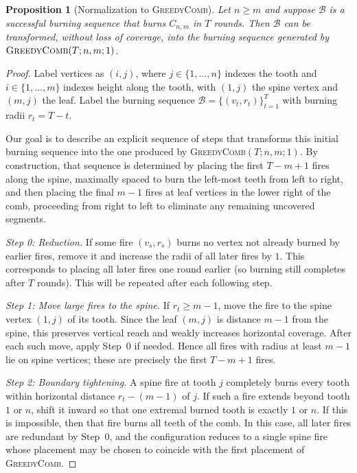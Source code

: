\documentclass{article}
\newtheorem{proposition}{Proposition}
\begin{document}
\begin{proposition}[Normalization to \textsc{GreedyComb}]\label{prop: normalize_greedy_comb}
Let $n \ge m$ and suppose $\mathcal B$ is a successful burning sequence
that burns $C_{n,m}$ in $T$ rounds.
Then $\mathcal B$ can be transformed, without loss of coverage,
into the burning sequence generated by $\textsc{GreedyComb}(T;n,m;1)$.
\end{proposition}

\begin{proof}
Label vertices as $(i,j)$,
where $j\in\{1,\dots,n\}$ indexes the tooth
and $i\in\{1,\dots,m\}$ indexes height along the tooth,
with $(1,j)$ the spine vertex
and $(m,j)$ the leaf. Label the burning sequence $\mathcal B=\{(v_t,r_t)\}_{t=1}^T$
with burning radii $r_t=T-t$.

Our goal is to describe an explicit sequence of steps that transforms this initial burning sequence into the one produced by \textsc{GreedyComb}$(T;n,m;1)$. By construction, that sequence is determined by placing the first $T-m+1$ fires along the spine, maximally spaced to burn the left-most teeth from left to right, and then placing the final $m-1$ fires at leaf vertices in the lower right of the comb, proceeding from right to left to eliminate any remaining uncovered segments.

\medskip
\noindent
\emph{Step 0: Reduction.}
If some fire $(v_s,r_s)$ burns no vertex
not already burned by earlier fires,
remove it and increase the radii of all later fires by $1$.
This corresponds to placing all later fires one round earlier (so burning still completes after $T$ rounds). This will be repeated after each following step.

\medskip
\noindent
\emph{Step 1: Move large fires to the spine.}
If $r_t \ge m-1$,
move the fire to the spine vertex $(1,j)$ of its tooth.
Since the leaf $(m,j)$ is distance $m-1$ from the spine,
this preserves vertical reach and weakly increases horizontal coverage.
After each such move, apply Step~0 if needed.
Hence all fires with radius at least $m-1$ lie on spine vertices; these are precisely the first $T-m+1$ fires.

\medskip
\noindent
\emph{Step 2: Boundary tightening.}
A spine fire at tooth $j$ completely burns every tooth
within horizontal distance $r_t-(m-1)$ of $j$.
If such a fire extends beyond tooth $1$ or $n$,
shift it inward so that one extremal burned tooth
is exactly $1$ or $n$.
If this is impossible,
then that fire burns all teeth of the comb.
In this case, all later fires are redundant by Step~0,
and the configuration reduces to a single spine fire
whose placement may be chosen to coincide
with the first placement of \textsc{GreedyComb}.


\end{proof}
\end{document}
